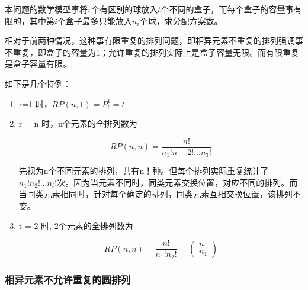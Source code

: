 \documentclass{article}
\begin{document}
本问题的数学模型事将$r$个有区别的球放入$t$个不同的盒子，而每个盒子的容量事有限的，其中第$i$个盒子最多只能放入$n_i$个球，求分配方案数。

相对于前两种情况，这种事有限重复的排列问题，即相异元素不重复的排列强调事不重复，即盒子的容量为1；允许重复的排列实际上是盒子容量无限。而有限重复是盒子容量有限。

如下是几个特例：

\begin{enumerate}
    \item r=1 时，$RP(n,1)=P^1_t = t$
    \item r = n 时，n个元素的全排列数为

    \begin{equation}
        RP(n,n) = \frac{n!}{n_1!n-2!\dots n_3!}
    \end{equation}

    先视为n个不同元素的排列，共有n！种。但每个排列实际重复统计了$n_1 !n_2!\dots n_t!$次。因为当元素不同时，同类元素交换位置，对应不同的排列。而当同类元素相同时，针对每个确定的排列，同类元素互相交换位置，该排列不变。

    \item t = 2 时, 2个元素的全排列数为
    
    \begin{equation}
        RP(n,n) = \frac{n!}{n_1!n_2!} = \begin{pmatrix}
            n \\ n_1
        \end{pmatrix}
    \end{equation}
\end{enumerate}

\subsubsection{相异元素不允许重复的圆排列}
\end{document}
